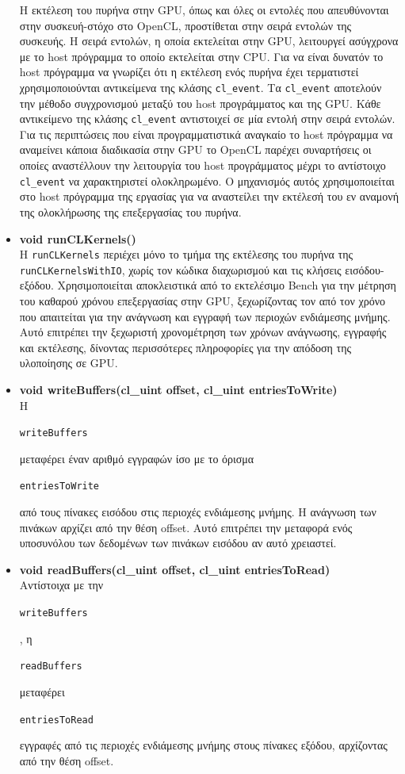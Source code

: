 \begin{itemize}
Η εκτέλεση του πυρήνα στην GPU, όπως και όλες οι εντολές που απευθύνονται στην συσκευή-στόχο στο OpenCL, προστίθεται στην σειρά εντολών της συσκευής. Η σειρά εντολών, η οποία εκτελείται στην GPU, λειτουργεί ασύγχρονα με το host πρόγραμμα το οποίο εκτελείται στην CPU. Για να είναι δυνατόν το host πρόγραμμα να γνωρίζει ότι η εκτέλεση ενός πυρήνα έχει τερματιστεί χρησιμοποιούνται αντικείμενα της κλάσης \verb!cl_event!. Τα \verb!cl_event! αποτελούν την μέθοδο συγχρονισμού μεταξύ του host προγράμματος και της GPU. Κάθε αντικείμενο της κλάσης \verb!cl_event! αντιστοιχεί σε μία εντολή στην σειρά εντολών. Για τις περιπτώσεις που είναι προγραμματιστικά αναγκαίο το host πρόγραμμα να αναμείνει κάποια διαδικασία στην GPU το OpenCL παρέχει συναρτήσεις οι οποίες αναστέλλουν την λειτουργία του host προγράμματος μέχρι το αντίστοιχο \verb!cl_event! να χαρακτηριστεί ολοκληρωμένο. Ο μηχανισμός αυτός χρησιμοποιείται στο host πρόγραμμα της εργασίας για να αναστείλει την εκτέλεσή του εν αναμονή της ολοκλήρωσης της επεξεργασίας 
του πυρήνα.  


\item \textbf{void runCLKernels()}\\ 
Η \verb!runCLKernels! περιέχει μόνο το τμήμα της εκτέλεσης του πυρήνα της \verb!runCLKernelsWithIO!, χωρίς τον κώδικα διαχωρισμού και τις κλήσεις εισόδου-εξόδου. Χρησιμοποιείται αποκλειστικά από το εκτελέσιμο Bench για την μέτρηση του καθαρού χρόνου επεξεργασίας στην GPU, ξεχωρίζοντας τον από τον χρόνο που απαιτείται για την ανάγνωση και εγγραφή των περιοχών ενδιάμεσης μνήμης. Αυτό επιτρέπει την ξεχωριστή χρονομέτρηση των χρόνων ανάγνωσης, εγγραφής και εκτέλεσης, δίνοντας περισσότερες πληροφορίες για την απόδοση της υλοποίησης σε GPU.


\item \textbf{void writeBuffers(cl\_uint offset, cl\_uint entriesToWrite)}\\ 
H \begin{english}\verb!writeBuffers!\end{english} μεταφέρει έναν αριθμό εγγραφών ίσο με το όρισμα \begin{english}\verb!entriesToWrite!\end{english} από τους πίνακες εισόδου στις περιοχές ενδιάμεσης μνήμης. Η ανάγνωση των πινάκων αρχίζει από την θέση offset. Αυτό επιτρέπει την μεταφορά ενός υποσυνόλου των δεδομένων των πινάκων εισόδου αν αυτό χρειαστεί. 


\item \textbf{void readBuffers(cl\_uint offset, cl\_uint entriesToRead)}\\ 
Αντίστοιχα με την \begin{english}\verb!writeBuffers!\end{english}, η \begin{english}\verb!readBuffers!\end{english} μεταφέρει \begin{english}\verb!entriesToRead!\end{english} εγγραφές από τις περιοχές ενδιάμεσης μνήμης στους πίνακες εξόδου, αρχίζοντας από την θέση offset.




\end{itemize}
